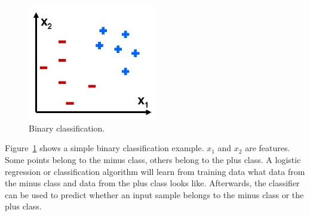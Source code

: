 \begin{figure}[H]
\centering
\includegraphics[width=0.5\textwidth]{Figures/binclass}
\decoRule
\caption[Binary classification]{Binary classification. \cite{binclass}}
\label{fig:binclass}
\end{figure}
\noindent Figure~\ref{fig:binclass} shows a simple binary classification example. $x_1$ and $x_2$ are features. Some points belong to the minus class, others belong to the plus class. A logistic regression or classification algorithm will learn from training data what data from the minus class and data from the plus class looks like. Afterwards, the classifier can be used to predict whether an input sample belongs to the minus class or the plus class.

